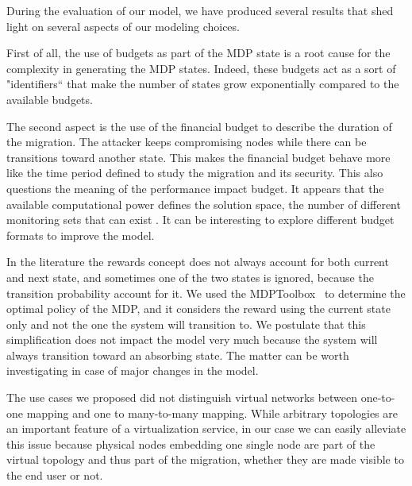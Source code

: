 During the evaluation of our model, we have produced several results that shed light on several aspects of our modeling choices.

First of all, the use of budgets as part of the MDP state is a root cause for the complexity in generating the MDP states. Indeed, these budgets act as a sort of "identifiers`` that make the number of states grow exponentially compared to the available budgets.

The second aspect is the use of the financial budget to describe the duration of the migration. The attacker keeps compromising nodes while there can be transitions toward another state. This makes the financial budget behave more like the time period defined to study the migration and its security. This also questions the meaning of the performance impact budget. It appears that the available computational power defines the solution space, the number of different monitoring sets that can exist \etc. 
It can be interesting to explore different budget formats to improve the model.

In the literature the rewards concept does not always account for both current and next state, and sometimes one of the two states is ignored, because the transition probability account for it. We used the MDPToolbox~\cite{Chades2014} to determine the optimal policy  of the MDP, and it considers the reward using the current state only and not the one the system will transition to. We postulate that this simplification does not impact the model very much because the system will always transition toward an absorbing state.
The matter can be worth investigating in case of major changes in the model.

The use cases we proposed did not distinguish virtual networks between one-to-one mapping and one to many-to-many mapping. While arbitrary topologies are an important feature of a virtualization service, in our case we can easily alleviate this issue because physical nodes embedding one single node are part of the virtual topology and thus part of the migration, whether they are made visible to the end user or not.

